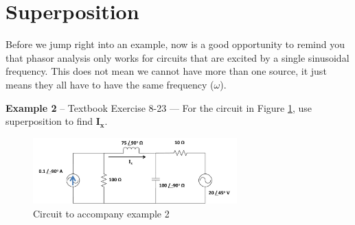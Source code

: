 \documentclass{handout}
\begin{document}
\newpage
\clearpage
\pagebreak

\section{Superposition}
Before we jump right into an example, now is a good opportunity to remind you that phasor analysis only works for circuits that are excited by a single sinusoidal frequency.  This does not mean we cannot have more than one source, it just means they all have to have the same frequency ($\omega$).

\textbf{Example 2} -- Textbook Exercise 8-23 --- For the circuit in Figure \ref{fig: Example2}, use superposition to find $\mathbf{I_x}$.
\begin{figure} [h!]
\centering
\includegraphics[width=0.7\textwidth]{Example2.jpg}
\caption{Circuit to accompany example 2}
\label{fig: Example2}
\end{figure}

\end{document}
